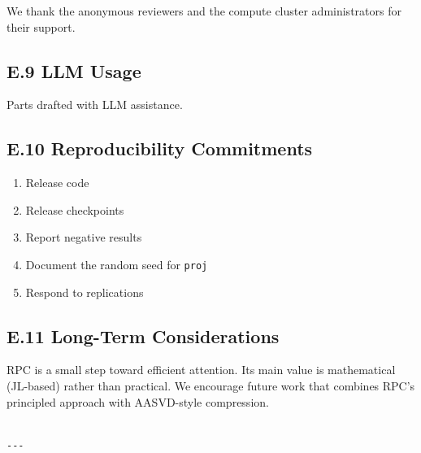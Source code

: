 We thank the anonymous reviewers and the compute cluster administrators for their support.

\subsection{E.9 LLM Usage}

Parts drafted with LLM assistance.

\subsection{E.10 Reproducibility Commitments}

\begin{enumerate}
\item Release code
\item Release checkpoints
\item Report negative results
\item Document the random seed for \texttt{proj}
\item Respond to replications

\end{enumerate}
\subsection{E.11 Long-Term Considerations}

RPC is a small step toward efficient attention. Its main value is 
mathematical (JL-based) rather than practical. We encourage future work 
that combines RPC's principled approach with AASVD-style compression.
\begin{lstlisting}

---
\end{lstlisting}